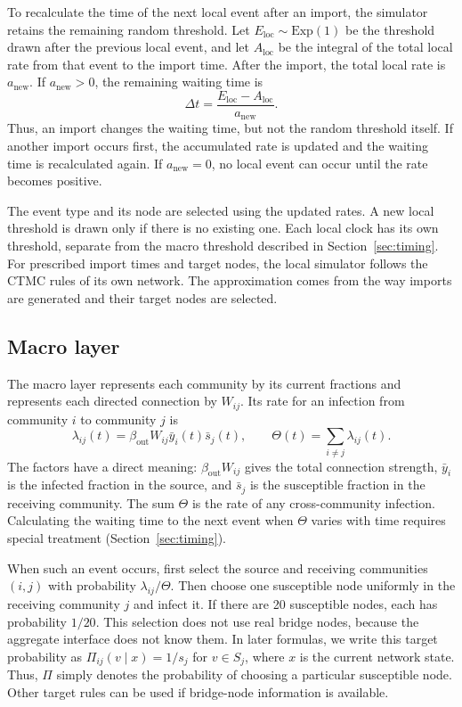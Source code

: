 \documentclass[a4paper,fleqn]{cas-sc}
\newcommand{\ibar}{\bar{y}}
\newcommand{\sbar}{\bar{s}}
\begin{document}
To recalculate the time of the next local event after an import, the simulator retains the remaining random threshold. Let $E_{\mathrm{loc}}\sim\mathrm{Exp}(1)$ be the threshold drawn after the previous local event, and let $A_{\mathrm{loc}}$ be the integral of the total local rate from that event to the import time. After the import, the total local rate is $a_{\mathrm{new}}$. If $a_{\mathrm{new}}>0$, the remaining waiting time is
\[
\Delta t=
\frac{E_{\mathrm{loc}}-A_{\mathrm{loc}}}{a_{\mathrm{new}}}.
\]
Thus, an import changes the waiting time, but not the random threshold itself. If another import occurs first, the accumulated rate is updated and the waiting time is recalculated again. If $a_{\mathrm{new}}=0$, no local event can occur until the rate becomes positive.

The event type and its node are selected using the updated rates. A new local threshold is drawn only if there is no existing one. Each local clock has its own threshold, separate from the macro threshold described in Section~\ref{sec:timing}. For prescribed import times and target nodes, the local simulator follows the CTMC rules of its own network. The approximation comes from the way imports are generated and their target nodes are selected.

\subsection{Macro layer}
\label{sec:macro}

The macro layer represents each community by its current fractions and represents each directed connection by $W_{ij}$. Its rate for an infection from community $i$ to community $j$ is
\begin{equation}
\label{eq:macro_rate}
\lambda_{ij}(t)=\beta_{\mathrm{out}}W_{ij}\ibar_i(t)\sbar_j(t),
\qquad
\Theta(t)=\sum_{i\neq j}\lambda_{ij}(t).
\end{equation}
The factors have a direct meaning: $\beta_{\mathrm{out}}W_{ij}$ gives the total connection strength, $\ibar_i$ is the infected fraction in the source, and $\sbar_j$ is the susceptible fraction in the receiving community. The sum $\Theta$ is the rate of any cross-community infection. Calculating the waiting time to the next event when $\Theta$ varies with time requires special treatment (Section~\ref{sec:timing}).

When such an event occurs, first select the source and receiving communities $(i,j)$ with probability $\lambda_{ij}/\Theta$. Then choose one susceptible node uniformly in the receiving community $j$ and infect it. If there are 20 susceptible nodes, each has probability $1/20$. This selection does not use real bridge nodes, because the aggregate interface does not know them. In later formulas, we write this target probability as $\Pi_{ij}(v\mid x)=1/s_j$ for $v\in S_j$, where $x$ is the current network state. Thus, $\Pi$ simply denotes the probability of choosing a particular susceptible node. Other target rules can be used if bridge-node information is available.
\end{document}
